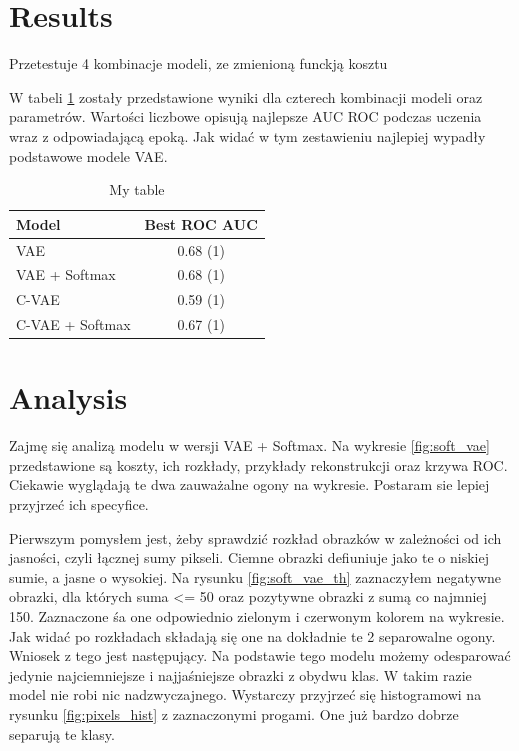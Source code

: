 \section{Results}

Przetestuje 4 kombinacje modeli, ze zmienioną funckją kosztu


W tabeli \ref{table:results} zostały przedstawione wyniki dla czterech kombinacji modeli oraz parametrów. Wartości liczbowe opisują najlepsze AUC ROC podczas uczenia wraz z odpowiadającą epoką. Jak widać w tym zestawieniu najlepiej wypadły podstawowe modele VAE.

\begin{table}[h!]
	\centering
    \begin{tabular}{ l | c }
    \toprule
    Model 			& Best ROC AUC \\ \midrule
    VAE 				& 0.68 (1) \\
    VAE + Softmax 	& 0.68 (1) \\
    C-VAE 			& 0.59 (1) \\
    C-VAE + Softmax & 0.67 (1) \\
    \bottomrule
    \end{tabular}
    \caption{My table}
	\label{table:results}
\end{table}

\section{Analysis}

Zajmę się analizą modelu w wersji VAE + Softmax. Na wykresie \ref{fig:soft_vae} przedstawione są koszty, ich rozkłady, przykłady rekonstrukcji oraz krzywa ROC. Ciekawie wyglądają te dwa zauważalne ogony na wykresie. Postaram sie lepiej przyjrzeć ich specyfice. 

Pierwszym pomysłem jest, żeby sprawdzić rozkład obrazków w zależności od ich jasności, czyli łącznej sumy pikseli. Ciemne obrazki defiuniuje jako te o niskiej sumie, a jasne o wysokiej. Na rysunku \ref{fig:soft_vae_th} zaznaczyłem negatywne obrazki, dla których suma <= 50 oraz pozytywne obrazki z sumą co najmniej 150. Zaznaczone śa one odpowiednio zielonym i czerwonym kolorem na wykresie. Jak widać po rozkładach składają się one na dokładnie te 2 separowalne ogony. Wniosek z tego jest następujący. Na podstawie tego modelu możemy odesparować jedynie najciemniejsze i najjaśniejsze obrazki z obydwu klas. W takim razie model nie robi nic nadzwyczajnego. Wystarczy przyjrzeć się histogramowi na rysunku \ref{fig:pixels_hist} z zaznaczonymi progami. One już bardzo dobrze separują te klasy. 


